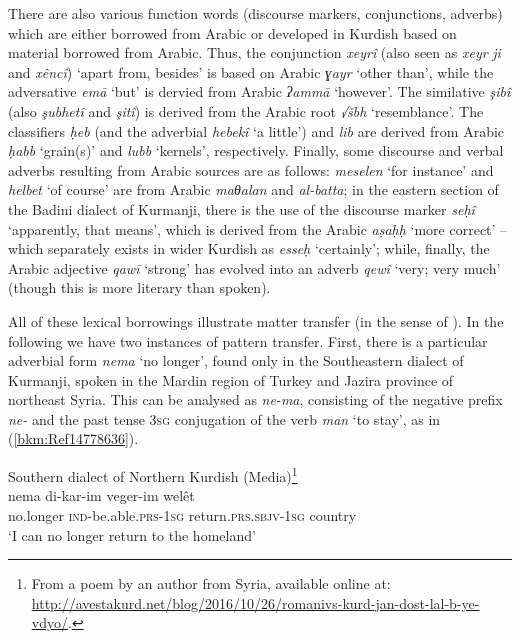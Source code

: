 \documentclass[output=paper]{langsci/langscibook}
\begin{document}
There are also various function words (discourse markers, conjunctions, adverbs) which are either borrowed from Arabic or developed in Kurdish based on material borrowed from Arabic. Thus, the conjunction \textit{xeyrî} (also seen as \textit{xeyr} \textit{ji} and \textit{xêncî}) ‘apart from, besides’ is based on Arabic \textit{ɣayr} ‘other than’, while the adversative \textit{emā} ‘but’ is dervied from Arabic \textit{ʔammā} ‘however’. The similative \textit{şibî} (also \textit{şubhetî} and \textit{şitî}) is derived from the Arabic root \textit{√šbh} ‘resemblance’. The classifiers \textit{ḥeb} (and the adverbial \textit{hebekî} ‘a little’) and \textit{lib} are derived from Arabic \textit{ḥabb} ‘grain(s)’ and \textit{lubb} ‘kernels’, respectively. Finally, some discourse and verbal adverbs resulting from Arabic sources are as follows: \textit{meselen} ‘for instance’ and \textit{helbet} ‘of course’ are from Arabic \textit{maθalan} and \textit{al-batta}; in the eastern section of the Badini dialect of Kurmanji, there is the use of the discourse marker \textit{seḥî} ‘apparently, that means’, which is derived from the Arabic \textit{aṣaḥḥ} ‘more correct’ – which separately exists in wider Kurdish as \textit{esseḥ} ‘certainly’; while, finally, the Arabic adjective \textit{qawī} ‘strong’ has evolved into an adverb \textit{qewî} ‘very; very much’ (though this is more literary than spoken).      

All of these lexical borrowings illustrate matter transfer (in the sense of \citealt{MatrasSakel2007}). In the following we have two instances of pattern transfer. First, there is a particular adverbial form \textit{nema} ‘no longer’, found only in the Southeastern dialect of Kurmanji, spoken in the Mardin region of Turkey and Jazira province of northeast Syria. This can be analysed as \textit{ne-ma}, consisting of the negative prefix \textit{ne-} and the past tense 3\textsc{sg} conjugation of the verb \textit{man} ‘to stay’, as in (\ref{bkm:Ref14778636}).

\ea
Southern dialect of Northern Kurdish (Media)\label{bkm:Ref14778636}\footnote{From a poem by an author from Syria, available online at: \url{http://avestakurd.net/blog/2016/10/26/romanivs-kurd-jan-dost-lal-b-ye-vdyo/}.} \\
\gll nema di-kar-im veger-im welêt\\
     no.longer \textsc{ind}{}-be.able.\textsc{prs-1sg} return.\textsc{prs.sbjv-1sg} country\\
\glt `I can no longer return to the homeland'\z
\end{document}
